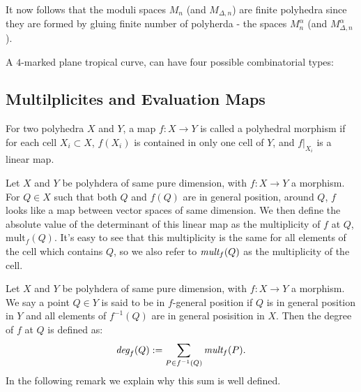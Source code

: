 \begin{remark}    
    It now follows that the moduli spaces $M_{n}$ (and $M_{\Delta, n}$) are finite polyhedra since they are formed by gluing finite number of polyherda - the spaces $M^{\alpha}_{n}$ (and $M_{\Delta,n}^{\alpha}$). 
\end{remark}

\begin{example}[Looking at $M_{4}$]
    A $4$-marked plane tropical curve, can have four possible combinatorial types: 
\end{example}


\subsection{Multilplicites and Evaluation Maps}

\begin{definition}
   For two polyhedra $X$ and $Y$, a map $f:X \to Y$ is called a polyhedral morphism if for each cell $X_{i}\subset X$, $f(X_{i})$ is contained in only one cell of $Y$, and $f|_{X_{i}}$ is a linear map. 
\end{definition}

\begin{definition}
    Let $X$ and $Y$ be polyhdera of same pure dimension, with $f:X\to Y$ a morphism. 
    For $Q\in X$ such that both $Q$ and $f(Q)$ are in general position, around $Q$, $f$ looks like a map between vector spaces of same dimension.
    We then define the absolute value of the determinant of this linear map as the multiplicity of $f$ at $Q$, $\text{mult}_{f}(Q)$.
    It's easy to see that this multiplicity is the same for all elements of the cell which contains $Q$, so we also refer to $\emph{mult}_{f}(Q)$ as the multiplicity of the cell.
\end{definition}

\begin{definition}
    Let $X$ and $Y$ be polyhdera of same pure dimension, with $f:X\to Y$ a morphism. 
    We say a point $Q \in Y$ is said to be in $f$-general position if $Q$ is in general position in $Y$ and all elements of $f^{-1}(Q)$ are in general posisition in $X$.
    Then the degree of $f$ at $Q$ is defined as:
    \[
        \emph{deg}_{f}(Q):= \sum_{P \in f^{-1}(Q)}\emph{mult}_{f}(P).
    \]
    In the following remark we explain why this sum is well defined.
\end{definition}

